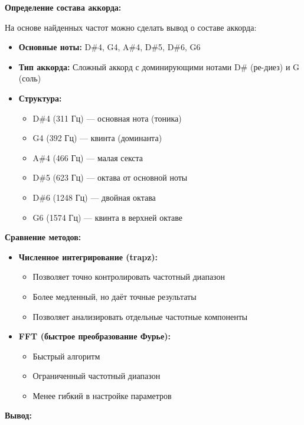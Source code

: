 \textbf{Определение состава аккорда:}

На основе найденных частот можно сделать вывод о составе аккорда:

\begin{itemize}
    \item \textbf{Основные ноты:} D\#4, G4, A\#4, D\#5, D\#6, G6
    \item \textbf{Тип аккорда:} Сложный аккорд с доминирующими нотами D\# (ре-диез) и G (соль)
    \item \textbf{Структура:}
    \begin{itemize}
        \item D\#4 (311 Гц) — основная нота (тоника)
        \item G4 (392 Гц) — квинта (доминанта)
        \item A\#4 (466 Гц) — малая секста
        \item D\#5 (623 Гц) — октава от основной ноты
        \item D\#6 (1248 Гц) — двойная октава
        \item G6 (1574 Гц) — квинта в верхней октаве
    \end{itemize}
\end{itemize}

\textbf{Сравнение методов:}

\begin{itemize}
    \item \textbf{Численное интегрирование (trapz):}
    \begin{itemize}
        \item Позволяет точно контролировать частотный диапазон
        \item Более медленный, но даёт точные результаты
        \item Позволяет анализировать отдельные частотные компоненты
    \end{itemize}
    
    \item \textbf{FFT (быстрое преобразование Фурье):}
    \begin{itemize}
        \item Быстрый алгоритм
        \item Ограниченный частотный диапазон
        \item Менее гибкий в настройке параметров
    \end{itemize}
\end{itemize}

\textbf{Вывод:}

